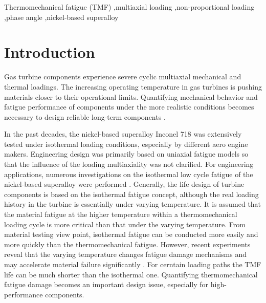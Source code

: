 \documentclass[preprint,5p,twocolumn,11pt,sort&compress]{elsarticle}
\begin{document}
\begin{frontmatter}
\begin{abstract}
\end{abstract}

%
\begin{keyword}
Thermomechanical fatigue (TMF) \sep multiaxial loading \sep non-proportional loading \sep phase angle \sep nickel-based superalloy

\end{keyword}
\end{frontmatter}

\section{Introduction}
Gas turbine components experience severe cyclic multiaxial mechanical and thermal loadings. The increasing operating temperature in gas turbines is pushing materials closer to their operational limits. Quantifying mechanical behavior and fatigue performance of components under the more realistic conditions becomes necessary to design reliable long-term components  \cite{Harrison1996}.

In the past decades, the nickel-based superalloy Inconel 718 was extensively tested under isothermal loading conditions, especially by different aero engine makers. Engineering design was primarily based on uniaxial fatigue models so that the influence of the loading multiaxiality was not clarified.
For engineering applications, numerous investigations on the isothermal low cycle fatigue of the nickel-based superalloy were performed \cite{Koch85, Morrow88, Mahobia2014, Chen2016, William1995, kim1988elevated, nelson1992creep}. 
Generally, the life design of turbine components is based on the isothermal fatigue concept, although the real loading history in the turbine is essentially under varying temperature. It is assumed that the material fatigue at the higher temperature within a thermomechanical loading cycle is more critical than that under the varying temperature. From material testing view point, isothermal fatigue can be conducted more easily and more quickly than the thermomechanical fatigue. However, recent experiments reveal that the varying temperature changes fatigue damage mechanisms and may accelerate material failure significantly \cite{Evans2008, Kulawinski2015, Remy2003, Bauer2009}. For cerntain loading paths the TMF life can be much shorter than the isothermal one. Quantifying thermomechanical fatigue damage becomes an important design issue, especially for high-performance components.
\end{document}
